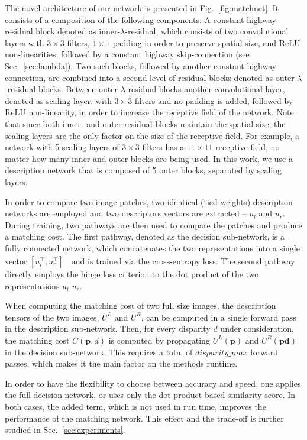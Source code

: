 \documentclass[10pt, twocolumn, letterpaper]{article}
\begin{document}
The novel architecture of our network is presented in Fig.~\ref{fig:matchnet}. It consists of a composition of the following components: A constant highway residual block denoted as inner-$\lambda$-residual, which consists of two convolutional layers with $3\times3$ filters, $1\times1$ padding in order to preserve spatial size, and ReLU non-linearities, followed by a constant highway skip-connection (see Sec.~\ref{sec:lambda}).
Two such blocks, followed by another constant highway connection, are combined into a second level of residual blocks denoted as outer-$\lambda$-residual blocks. Between outer-$\lambda$-residual blocks another convolutional layer, denoted as scaling layer, with $3\times3$ filters and no padding is added, followed by ReLU non-linearity, in order to increase the receptive field of the network. Note that since both inner- and outer-residual blocks maintain the spatial size, the scaling layers are the only factor on the size of the receptive field. For example, a network with 5 scaling layers of $3\times3$ filters has a $11\times 11$ receptive field, no matter how many inner and outer blocks are being used. In this work, we use a description network that is composed of 5 outer blocks, separated by scaling layers.

In order to compare two image patches, two identical (tied weights) description networks are employed and two descriptors vectors are extracted --  $u_{l}$ and $u_r$. During training, two pathways are then used to compare the patches and produce a matching cost. The first pathway, denoted as the decision sub-network, is a fully connected network, which concatenates the two representations into a single vector $[u_l^\top, u_r^\top]^\top$ and is trained via the cross-entropy loss. The second pathway directly employs the hinge loss criterion to the dot product of the two representations $u_l^\top u_r$.

When computing the matching cost of two full size images, the description tensors of the two images, $U^L$ and $U^R$, can be computed in a single forward pass in the description sub-network. Then, for every disparity $d$ under consideration, the matching cost $C(\mathbf{p},d)$ is computed by propagating $U^L(\mathbf{p})$ and $U^R(\mathbf{pd})$ in the decision sub-network. This requires a total of $disparity\_max$ forward passes, which makes it the main factor on the methods runtime.

In order to have the flexibility to choose between accuracy and speed, one applies the full decision network, or uses only the dot-product based similarity score. In both cases, the added term, which is not used in run time, improves the performance of the matching network. This effect and the trade-off is further studied in Sec.~\ref{sec:experiments}.
\end{document}
